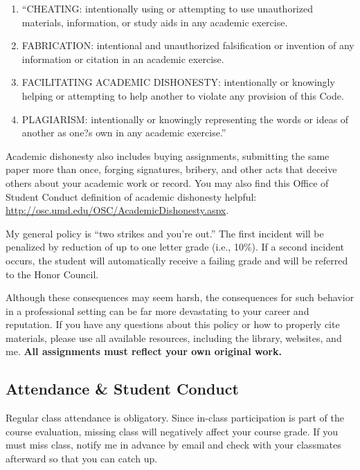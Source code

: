 \documentclass[11pt]{article}
\begin{document}
\begin{enumerate}
\item ``CHEATING: intentionally using or attempting to use unauthorized materials, information, or study aids in any academic exercise.
\item FABRICATION: intentional and unauthorized falsification or invention of any information or citation in an academic exercise.
\item FACILITATING ACADEMIC DISHONESTY: intentionally or knowingly helping or attempting to help another to violate any provision of this Code.
\item PLAGIARISM: intentionally or knowingly representing the words or ideas of another as one?s own in any academic exercise.''
\end{enumerate}


Academic dishonesty also includes buying assignments, submitting the same paper more than once, forging signatures, bribery, and other acts that deceive others about your academic work or record. 
You may also find this Office of Student Conduct definition of academic dishonesty helpful: \url{http://osc.umd.edu/OSC/AcademicDishonesty.aspx}.
 
My general policy is ``two strikes and you're out.'' 
The first incident will be penalized by reduction of up to one letter grade (i.e., 10\%). 
 If a second incident occurs, the student will automatically receive a failing grade and will be referred to the Honor Council.
 
Although these consequences may seem harsh, the consequences for such behavior in a professional setting can be far more devastating to your career and reputation.
If you have any questions about this policy or how to properly cite materials, please use all available resources, including the library, websites, and me.
\textbf{All assignments must reflect your own original work. }

\subsection{Attendance \& Student Conduct}
Regular class attendance is obligatory. 
Since in-class participation is part of the course evaluation, missing class will negatively affect your course grade.
If you must miss class, notify me in advance by email and check with your classmates afterward so that you can catch up.
\end{document}
